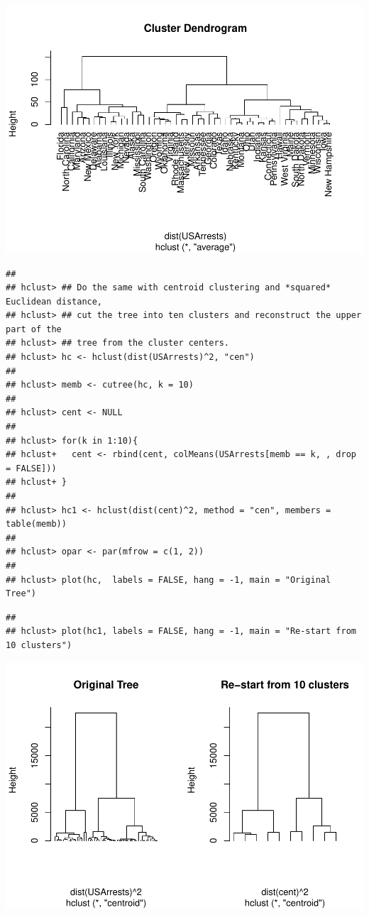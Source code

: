 \documentclass[
]{book}
\begin{document}
\includegraphics{bookdown-demo_files/figure-latex/unnamed-chunk-11-2.pdf}

\begin{verbatim}
## 
## hclust> ## Do the same with centroid clustering and *squared* Euclidean distance,
## hclust> ## cut the tree into ten clusters and reconstruct the upper part of the
## hclust> ## tree from the cluster centers.
## hclust> hc <- hclust(dist(USArrests)^2, "cen")
## 
## hclust> memb <- cutree(hc, k = 10)
## 
## hclust> cent <- NULL
## 
## hclust> for(k in 1:10){
## hclust+   cent <- rbind(cent, colMeans(USArrests[memb == k, , drop = FALSE]))
## hclust+ }
## 
## hclust> hc1 <- hclust(dist(cent)^2, method = "cen", members = table(memb))
## 
## hclust> opar <- par(mfrow = c(1, 2))
## 
## hclust> plot(hc,  labels = FALSE, hang = -1, main = "Original Tree")
\end{verbatim}

\begin{verbatim}
## 
## hclust> plot(hc1, labels = FALSE, hang = -1, main = "Re-start from 10 clusters")
\end{verbatim}

\includegraphics{bookdown-demo_files/figure-latex/unnamed-chunk-11-3.pdf}
\end{document}
